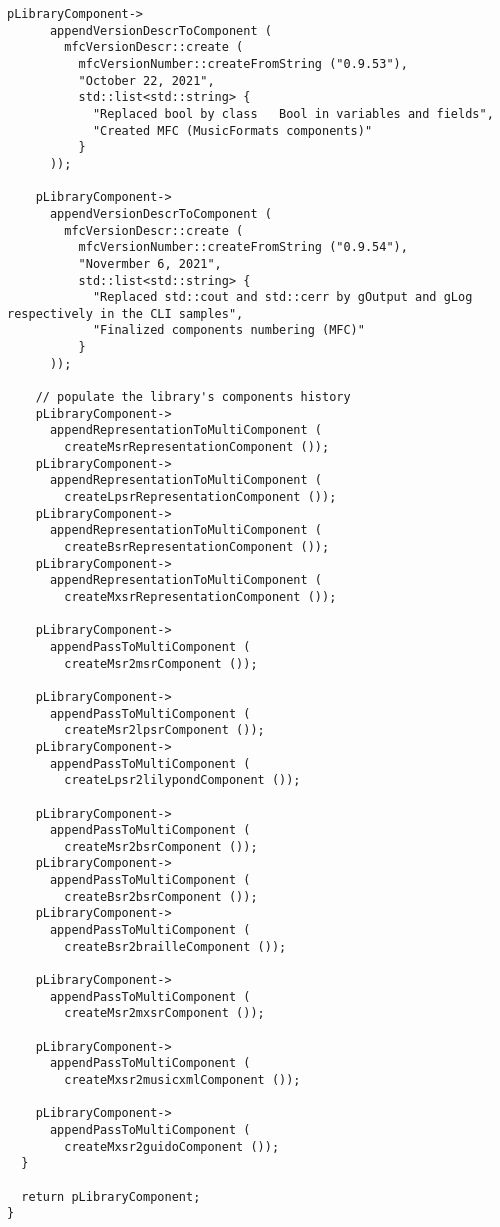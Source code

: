 \begin{lstlisting}[language=CPlusPlus]
    pLibraryComponent->
      appendVersionDescrToComponent (
        mfcVersionDescr::create (
          mfcVersionNumber::createFromString ("0.9.53"),
          "October 22, 2021",
          std::list<std::string> {
            "Replaced bool by class   Bool in variables and fields",
            "Created MFC (MusicFormats components)"
          }
      ));

    pLibraryComponent->
      appendVersionDescrToComponent (
        mfcVersionDescr::create (
          mfcVersionNumber::createFromString ("0.9.54"),
          "Novermber 6, 2021",
          std::list<std::string> {
            "Replaced std::cout and std::cerr by gOutput and gLog respectively in the CLI samples",
            "Finalized components numbering (MFC)"
          }
      ));

    // populate the library's components history
    pLibraryComponent->
      appendRepresentationToMultiComponent (
        createMsrRepresentationComponent ());
    pLibraryComponent->
      appendRepresentationToMultiComponent (
        createLpsrRepresentationComponent ());
    pLibraryComponent->
      appendRepresentationToMultiComponent (
        createBsrRepresentationComponent ());
    pLibraryComponent->
      appendRepresentationToMultiComponent (
        createMxsrRepresentationComponent ());

    pLibraryComponent->
      appendPassToMultiComponent (
        createMsr2msrComponent ());

    pLibraryComponent->
      appendPassToMultiComponent (
        createMsr2lpsrComponent ());
    pLibraryComponent->
      appendPassToMultiComponent (
        createLpsr2lilypondComponent ());

    pLibraryComponent->
      appendPassToMultiComponent (
        createMsr2bsrComponent ());
    pLibraryComponent->
      appendPassToMultiComponent (
        createBsr2bsrComponent ());
    pLibraryComponent->
      appendPassToMultiComponent (
        createBsr2brailleComponent ());

    pLibraryComponent->
      appendPassToMultiComponent (
        createMsr2mxsrComponent ());

    pLibraryComponent->
      appendPassToMultiComponent (
        createMxsr2musicxmlComponent ());

    pLibraryComponent->
      appendPassToMultiComponent (
        createMxsr2guidoComponent ());
  }

  return pLibraryComponent;
}
\end{lstlisting}

